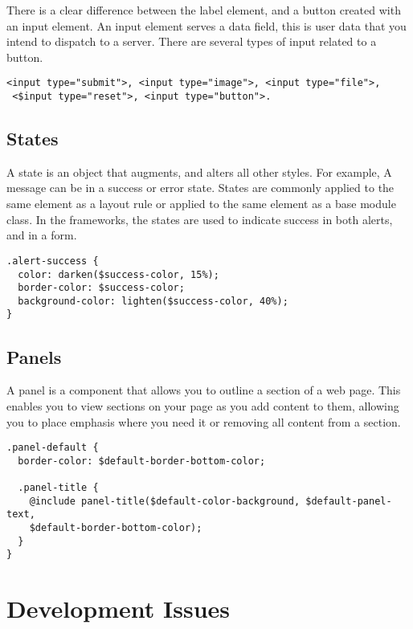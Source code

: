 There is a clear difference between the label element, and a button created with an input element. An input element serves a data field, this is user data that you intend to dispatch to a server. There are several types of input related to a button.

\begin{lstlisting}[language=CSS3]
 <input type="submit">, <input type="image">, <input type="file">, 
 <$input type="reset">, <input type="button">. 
\end{lstlisting}

\newpage
\subsection*{States}
A state is an object that augments, and alters all other styles. For example, A message can be in a success or error state. States are commonly applied to the same element as a layout rule or applied to the same element as a base module class. In the frameworks, the states are used to indicate success in both alerts, and in a form. 

\begin{lstlisting}[language=CSS3]
.alert-success {
  color: darken($success-color, 15%);
  border-color: $success-color;
  background-color: lighten($success-color, 40%);
}
\end{lstlisting}

\subsection*{Panels}
A panel is a component that allows you to outline a section of a web page. This enables you to view sections on your page as you add content to them, allowing you to place emphasis where you need it or removing all content from a section. 

\begin{lstlisting}[language=CSS3]
.panel-default {
  border-color: $default-border-bottom-color;

  .panel-title {
    @include panel-title($default-color-background, $default-panel-text, 
    $default-border-bottom-color);
  }
}
\end{lstlisting}

\newpage
\section*{Development Issues}

